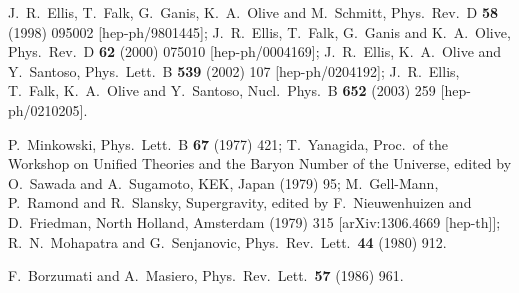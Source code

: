 \documentclass[final,3p,11pt,pdflatex]{elsarticle}
\newcommand{\ptitle}[1]{\emph{#1}}
\renewcommand{\ptitle}[1]{}
\begin{document}
\begin{thebibliography}{100}
  J.~R.~Ellis, T.~Falk, G.~Ganis, K.~A.~Olive and M.~Schmitt,
  Phys.\ Rev.\ D {\bf 58} (1998) 095002
  [hep-ph/9801445];
  J.~R.~Ellis, T.~Falk, G.~Ganis and K.~A.~Olive,
  Phys.\ Rev.\ D {\bf 62} (2000) 075010
  [hep-ph/0004169];
%
  J.~R.~Ellis, K.~A.~Olive and Y.~Santoso,
  Phys.\ Lett.\ B {\bf 539} (2002) 107
  [hep-ph/0204192];
  J.~R.~Ellis, T.~Falk, K.~A.~Olive and Y.~Santoso,
  Nucl.\ Phys.\ B {\bf 652} (2003) 259
  [hep-ph/0210205].

  P.~Minkowski, \ptitle{
  $\mu \rightarrow e \gamma$ at a Rate of One Out of 1-Billion Muon Decays?,}
  Phys.\ Lett.\ B {\bf 67} (1977) 421;
  T.~Yanagida, \ptitle{
  Horizontal Symmetry And Masses Of Neutrinos,}
  Proc.\ of the
  Workshop on Unified Theories and the Baryon Number of the Universe,
  edited by O.~Sawada and A.~Sugamoto, KEK, Japan (1979) 95;
  M.~Gell-Mann, P.~Ramond and R.~Slansky, \ptitle{
  Complex Spinors and Unified Theories,}
  Supergravity, edited by F.~Nieuwenhuizen and
  D.~Friedman, North Holland, Amsterdam (1979) 315
  [arXiv:1306.4669 [hep-th]];
  R.~N.~Mohapatra and G.~Senjanovic, \ptitle{
  Neutrino Mass and Spontaneous Parity Nonconservation,}
  Phys.\ Rev.\ Lett.\  {\bf 44} (1980) 912.

  F.~Borzumati and A.~Masiero, \ptitle{
Large Muon- and electron-Number Nonconservation in Supergravity Theories,}
  Phys.\ Rev.\ Lett.\  {\bf 57} (1986) 961.


\end{thebibliography}
\end{document}
